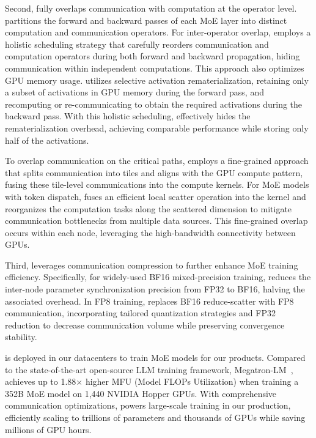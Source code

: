 Second, \sysname fully overlaps communication with computation at the operator level. \sysname partitions the forward and backward passes of each MoE layer into distinct computation and communication operators. For inter-operator overlap, \sysname employs a holistic 
scheduling strategy that carefully reorders communication and computation operators during both forward and backward propagation, hiding communication within independent computations. This approach also optimizes GPU memory usage. \sysname utilizes selective activation rematerialization, retaining only a subset of activations in GPU memory during the forward pass, and recomputing or re-communicating to obtain the required activations during the backward pass. With this holistic scheduling, \sysname effectively hides the rematerialization overhead, achieving comparable performance while storing only half of the activations. 

To overlap communication on the critical paths, \sysname employs a fine-grained approach that splits communication into tiles and aligns with the GPU compute pattern, fusing these tile-level communications into the compute kernels. For MoE models with token dispatch, \sysname fuses an efficient local scatter operation into the kernel and reorganizes the computation tasks along the scattered dimension to mitigate communication bottlenecks from multiple data sources. This fine-grained overlap occurs within each node, leveraging the high-bandwidth connectivity between GPUs. 

Third, \sysname leverages communication compression to further enhance MoE training efficiency. Specifically, for widely-used BF16 mixed-precision training, \sysname reduces the inter-node parameter synchronization precision from FP32 to BF16, halving the associated overhead. In FP8 training, \sysname replaces BF16 reduce-scatter with FP8 communication, incorporating tailored quantization strategies and FP32 reduction to decrease communication volume while preserving convergence stability.

\sysname is deployed in our datacenters to train MoE models for our products. Compared to the state-of-the-art open-source LLM training framework, Megatron-LM~\cite{shoeybi2019megatron}, \sysname achieves up to 1.88$\times$ higher MFU (Model FLOPs Utilization) when training a 352B MoE model on 1,440 NVIDIA Hopper GPUs. With comprehensive communication  optimizations, \sysname powers large-scale training in our production, efficiently scaling to trillions of parameters and thousands of GPUs while saving millions of GPU hours.